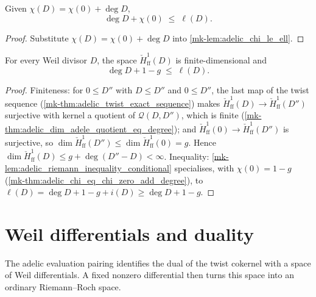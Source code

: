 \begin{lemma}
  \label{mk-lem:adelic_riemann_inequality_conditional}
  \leanok
  Given \(\chi(D) = \chi(0) + \deg D\),
  \[
    \deg D + \chi(0) \;\le\; \ell(D).
  \]
\end{lemma}
\begin{proof}
  \leanok
  Substitute \(\chi(D) = \chi(0) + \deg D\) into
  \ref{mk-lem:adelic_chi_le_ell}.
\end{proof}

\begin{corollary}
  \label{mk-thm:adelic_riemann_inequality}
  For every Weil divisor \(D\), the space
  \(\check{H}^1_{\mathrm{ff}}(D)\) is
  finite-dimensional and
  \[
    \deg D + 1 - g \;\le\; \ell(D) .
  \]
\end{corollary}
\begin{proof}
  Finiteness: for \(0 \le D''\) with \(D \le D''\) and \(0 \le D''\), the
  last map of the twist sequence
  (\ref{mk-thm:adelic_twist_exact_sequence}) makes
  \(\check{H}^1_{\mathrm{ff}}(D) \to
  \check{H}^1_{\mathrm{ff}}(D'')\) surjective with kernel a
  quotient of \(\mathcal{Q}(D, D'')\), which is finite
  (\ref{mk-thm:adelic_dim_adele_quotient_eq_degree}); and
  \(\check{H}^1_{\mathrm{ff}}(0) \to
  \check{H}^1_{\mathrm{ff}}(D'')\) is surjective, so
  \(\dim \check{H}^1_{\mathrm{ff}}(D'')
    \le \dim \check{H}^1_{\mathrm{ff}}(0) = g\). Hence
  \(\dim \check{H}^1_{\mathrm{ff}}(D)
    \le g + \deg(D'' - D) < \infty\). Inequality:
  \ref{mk-lem:adelic_riemann_inequality_conditional} specialises, with
  \(\chi(0) = 1-g\)
  (\ref{mk-thm:adelic_chi_eq_chi_zero_add_degree}), to
  \(\ell(D) = \deg D + 1 - g + i(D) \ge \deg D + 1 - g\).
\end{proof}

\section{Weil differentials and duality}
\label{mk-sec:RiemannRoch_Adelic_duality}

The adelic evaluation pairing identifies the dual of the twist cokernel
with a space of Weil differentials.  A fixed nonzero differential then
turns this space into an ordinary Riemann--Roch space.

